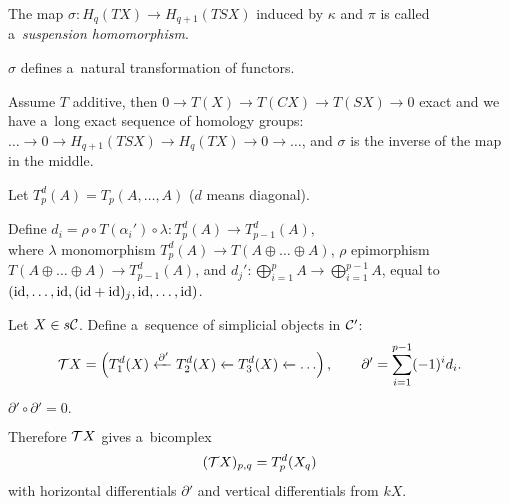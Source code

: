     \begin{definition}
        The map $\sigma:H_q(TX) \to H_{q+1}(TSX)$ induced by $\kappa$
        and $\pi$ is called a~{\em suspension homomorphism}.
    \end{definition}
    
    \begin{proposition}
        $\sigma$ defines a~natural transformation of functors.
    \end{proposition}
    
    \begin{proposition}
        Assume $T$ additive, then $0 \to T(X) \to T(CX) \to T(SX) \to 0$ exact
        and we have a~long exact sequence of homology groups:
        ${\ldots \to 0 \to H_{q+1}(TSX) \to H_q(TX) \to 0 \to \ldots}$,
        and $\sigma$ is the inverse of the map in the middle.
    \end{proposition}
    
    \begin{definition}
        Let $T_p^d(A) = T_p(A,\ldots,A)$ ($d$ means diagonal).
    \end{definition}
    
    \begin{definition}
        Define $d_i = \rho \circ T(\alpha_i') \circ \lambda:
        T_p^d(A) \to T_{p-1}^d(A),$ \\
        where $\lambda$ monomorphism $T_p^d(A) \to T(A \oplus \ldots \oplus A)$,
        $\rho$ epimorphism $T(A\oplus \ldots \oplus A) \to T_{p-1}^d(A)$,
        and $d_j':\bigoplus_{i=1}^p A \to \bigoplus_{i=1}^{p-1} A$,
        equal to $(\mathrm{id}, \ldots, \mathrm{id}, (\mathrm{id} + \mathrm{id})_j, \mathrm{id},\ldots, \mathrm{id})$.
    \end{definition}
    
    \begin{definition}
        Let $X \in s\mathcal{C}$. Define a~sequence of simplicial objects in $\mathcal{C}'$:
        $${\mathcal{T}}  X = \left(T_1^d(X) \xleftarrow{\partial'} T_2^d(X) 
        \xleftarrow{} T_3^d(X) \xleftarrow{} \ldots\right),
        \qquad \partial' = \sum_{i=1}^{p-1} (-1)^i d_i.$$
    \end{definition}
    
    \begin{remark}
        $\partial' \circ \partial' = 0.$
    \end{remark}
    
    \begin{corollary}
        Therefore ${\mathcal{T}}  X$ gives a~bicomplex $$({\mathcal{T}}  X)_{p,q} = T_p^d(X_q)$$
        with horizontal differentials $\partial'$ and vertical differentials 
        from $kX$.
    \end{corollary}
    
